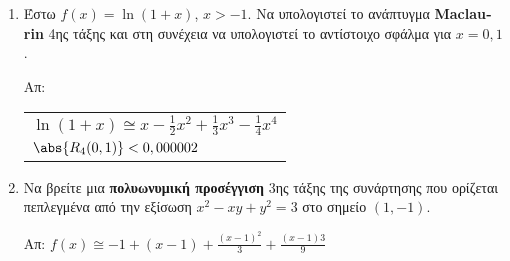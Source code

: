 \begin{enumerate}
  \item Έστω $ f(x) = \ln{(1+x)} $, $ x>-1 $. Να υπολογιστεί το ανάπτυγμα
    \textlatin{\textbf{Maclaurin}} 4ης τάξης και στη συνέχεια να υπολογιστεί το 
    αντίστοιχο σφάλμα για $ x = 0,1 $.

    \hfill Απ: \begin{tabular}{l}
      $ \ln(1+x) \cong x - \frac{1}{2} x^{2} + \frac{1}{3}x^{3} - 
      \frac{1}{4} x^{4} $ \\ 
      $ \abs{R_{4}(0,1)} < 0,000002$	
    \end{tabular}

  \item Να βρείτε μια \textbf{πολυωνυμική προσέγγιση} 3ης τάξης 
    της συνάρτησης που ορίζεται πεπλεγμένα από την εξίσωση 
    $ x^{2} - xy + y^{2} = 3$ στο σημείο $ (1,-1) $.

    \hfill Απ: $f(x) \cong -1 + (x-1) + \frac{(x-1)^{2}}{3} +
    \frac{(x-1){3}}{9}$

\end{enumerate}





